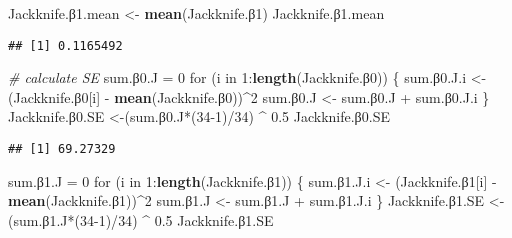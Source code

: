 \documentclass[]{article}
\newenvironment{Shaded}{\begin{snugshade}}{\end{snugshade}}
\newcommand{\KeywordTok}[1]{\textcolor[rgb]{0.13,0.29,0.53}{\textbf{{#1}}}}
\newcommand{\DecValTok}[1]{\textcolor[rgb]{0.00,0.00,0.81}{{#1}}}
\newcommand{\FloatTok}[1]{\textcolor[rgb]{0.00,0.00,0.81}{{#1}}}
\newcommand{\StringTok}[1]{\textcolor[rgb]{0.31,0.60,0.02}{{#1}}}
\newcommand{\CommentTok}[1]{\textcolor[rgb]{0.56,0.35,0.01}{\textit{{#1}}}}
\newcommand{\NormalTok}[1]{{#1}}
\begin{document}
\begin{Shaded}
\begin{Highlighting}[]
\NormalTok{Jackknife.β}\FloatTok{1.}\NormalTok{mean <-}\StringTok{ }\KeywordTok{mean}\NormalTok{(Jackknife.β}\DecValTok{1}\NormalTok{)}
\NormalTok{Jackknife.β}\FloatTok{1.}\NormalTok{mean}
\end{Highlighting}
\end{Shaded}

\begin{verbatim}
## [1] 0.1165492
\end{verbatim}

\begin{Shaded}
\begin{Highlighting}[]
\CommentTok{# calculate SE}
\NormalTok{sum.β}\FloatTok{0.}\NormalTok{J =}\StringTok{ }\DecValTok{0}
\NormalTok{for (i in }\DecValTok{1}\NormalTok{:}\KeywordTok{length}\NormalTok{(Jackknife.β}\DecValTok{0}\NormalTok{)) \{}
  \NormalTok{sum.β}\FloatTok{0.}\NormalTok{J.i <-}\StringTok{ }\NormalTok{(Jackknife.β}\DecValTok{0}\NormalTok{[i] -}\StringTok{ }\KeywordTok{mean}\NormalTok{(Jackknife.β}\DecValTok{0}\NormalTok{))^}\DecValTok{2}
  \NormalTok{sum.β}\FloatTok{0.}\NormalTok{J <-}\StringTok{ }\NormalTok{sum.β}\FloatTok{0.}\NormalTok{J +}\StringTok{ }\NormalTok{sum.β}\FloatTok{0.}\NormalTok{J.i}
\NormalTok{\}}
\NormalTok{Jackknife.β}\FloatTok{0.}\NormalTok{SE <-(sum.β}\FloatTok{0.}\NormalTok{J*(}\DecValTok{34-1}\NormalTok{)/}\DecValTok{34}\NormalTok{) ^}\StringTok{ }\FloatTok{0.5}
\NormalTok{Jackknife.β}\FloatTok{0.}\NormalTok{SE}
\end{Highlighting}
\end{Shaded}

\begin{verbatim}
## [1] 69.27329
\end{verbatim}

\begin{Shaded}
\begin{Highlighting}[]
\NormalTok{sum.β}\FloatTok{1.}\NormalTok{J =}\StringTok{ }\DecValTok{0}
\NormalTok{for (i in }\DecValTok{1}\NormalTok{:}\KeywordTok{length}\NormalTok{(Jackknife.β}\DecValTok{1}\NormalTok{)) \{}
  \NormalTok{sum.β}\FloatTok{1.}\NormalTok{J.i <-}\StringTok{ }\NormalTok{(Jackknife.β}\DecValTok{1}\NormalTok{[i] -}\StringTok{ }\KeywordTok{mean}\NormalTok{(Jackknife.β}\DecValTok{1}\NormalTok{))^}\DecValTok{2}
  \NormalTok{sum.β}\FloatTok{1.}\NormalTok{J <-}\StringTok{ }\NormalTok{sum.β}\FloatTok{1.}\NormalTok{J +}\StringTok{ }\NormalTok{sum.β}\FloatTok{1.}\NormalTok{J.i}
\NormalTok{\}}
\NormalTok{Jackknife.β}\FloatTok{1.}\NormalTok{SE <-(sum.β}\FloatTok{1.}\NormalTok{J*(}\DecValTok{34-1}\NormalTok{)/}\DecValTok{34}\NormalTok{) ^}\StringTok{ }\FloatTok{0.5}
\NormalTok{Jackknife.β}\FloatTok{1.}\NormalTok{SE}
\end{Highlighting}
\end{Shaded}
\end{document}
